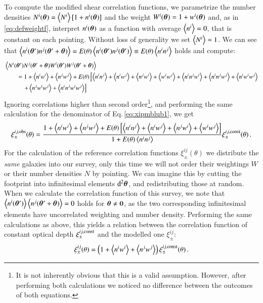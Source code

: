 To compute the modified shear correlation functions, we parametrize the number densities \linebreak$N^{i}(\b \theta)=\la N^{i} \ra [1+n^{i}(\b \theta)]$ and the weight $W^{i}(\b \theta)=1+w^{i}(\b \theta)$ and, as in \eqref{eq:defweightf}, interpret $n^{i}(\b \theta)$ as a function with average $\la n^{i} \ra = 0$, that is constant on each pointing. Without loss of generality we set $\la N^i\ra = 1$. We can see that $\la n^i(\bth)n^j(\bthp)\ra = E(\theta)\la n^i(\bth)n^j(\bth)\ra \equiv E(\theta)\la n^i n^j \ra$ holds and compute:
\begin{align}
&\la N^i(\bth)N^j(\bthp)W^i(\bth)W^j(\bthp)\ra \nonumber\\
&\qquad =  1 + \la n^iw^i\ra + \la n^j w^j\ra + E(\theta)\left[ \la n^in^j\ra + \la n^i w^j \ra  + \la n^jw^i\ra + \la w^iw^j\ra + \la n^in^jw^i\ra + \la n^in^jw^j\ra + \la n^iw^iw^j\ra \right. \nonumber\\
&\qquad\quad \left. + \la n^jw^iw^j\ra + \la n^in^jw^iw^j\ra  \right] 
 \end{align}
Ignoring correlations higher than second order\footnote{It is not inherently obvious that this is a valid assumption. However, after performing both calculations we noticed no difference between the outcomes of both equations.}, and performing the same calculation for the denominator of Eq.\,\eqref{eq:xipmblub1}, we get
 \begin{align}
 \xi^{ij,\rm{obs}}_\pm(\theta) = \frac{1 + \la n^iw^i\ra + \la n^jw^j\ra + E(\theta)\left[\la n^in^j\ra + \la n^iw^j\ra + \la n^j w^i\ra + \la w^iw^j\ra\right]}{1+E(\theta)\la n^i n^j\ra }\xi^{ij,\rm{const}}_\pm (\theta) \, .
 \end{align}
For the calculation of the reference correlation functions $\xi_\pm^{ij}(\theta)$ we distribute the \textit{same} galaxies into our survey, only this time we will not order their weightings $W$ or their number densities $N$ by pointing. We can imagine this by cutting the footprint into infinitesimal elements $\d^2\b\theta$, and redistributing those at random. When we calculate the correlation function of this survey, we note that $\la n^i(\bth)\ra \la n^j(\bthp)\ra = 0$ holds for $\b\theta\neq \b 0$, as the two corresponding infinitesimal elements have uncorrelated weighting and number density. Performing the same calculations as above, this yields a relation between the correlation function of constant optical depth $\xi_\pm^{ij,\rm{const}}$ and the modelled one $\xi_\pm^{ij}$:
\begin{equation}
\xi_\pm^{ij}(\theta) = \left(1+\la n^iw^i\ra + \la n^jw^j\ra \right)\xi_\pm^{ij,\rm{const}}(\theta)\, .
\end{equation}
